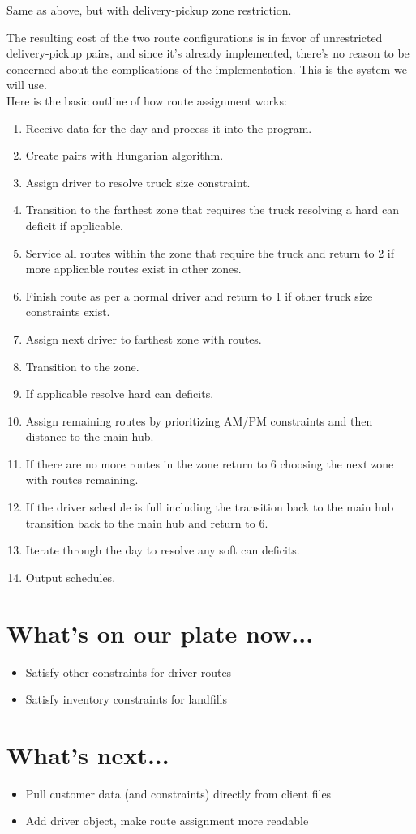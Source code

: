 \documentclass{article}
\begin{document}
\begin{center}
	Same as above, but with delivery-pickup zone restriction.
\end{center}

The resulting cost of the two route configurations is in favor of unrestricted
delivery-pickup pairs, and since it's already implemented, there's no reason
to be concerned about the complications of the implementation. This is the
system we will use.\\

\noindent Here is the basic outline of how route assignment works:
\begin{enumerate}
    \item Receive data for the day and process it into the program.
    \item Create pairs with Hungarian algorithm.
    \item Assign driver to resolve truck size constraint.
    \item Transition to the farthest zone that requires the truck resolving a hard can deficit if applicable.
    \item Service all routes within the zone that require the truck and return to 2 if more applicable routes exist in other zones.
    \item Finish route as per a normal driver and return to 1 if other truck size constraints exist.
    \item Assign next driver to farthest zone with routes.
    \item Transition to the zone.
    \item If applicable resolve hard can deficits.
    \item Assign remaining routes by prioritizing AM/PM constraints and then distance to the main hub.
    \item If there are no more routes in the zone return to 6 choosing the next zone with routes remaining.
    \item If the driver schedule is full including the transition back to the main hub transition back to the main hub and return to 6.
    \item Iterate through the day to resolve any soft can deficits.
    \item Output schedules.
\end{enumerate}

\section{What's on our plate now...}
\begin{itemize}
  \item Satisfy other constraints for driver routes
  \item Satisfy inventory constraints for landfills
\end{itemize}
\section{What's next...}
\begin{itemize}
	\item Pull customer data (and constraints) directly from client files
	\item Add driver object, make route assignment more readable
\end{itemize}
\end{document}
